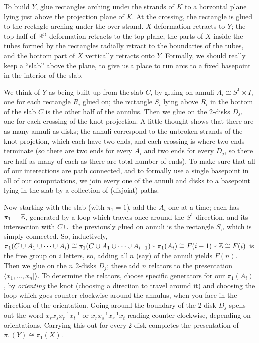 \msk


To build $Y$, glue rectangles arching under the strands of $K$ to a horzontal plane lying just above the projection plane of $K$. 
At the crossing, the rectangle is glued to the rectngle arching under the over-strand. $X$ deformation retracts to $Y$; the top half 
of ${\Bbb R}^3$ deformation retracts to the top plane, the parts of $X$ inside the tubes formed by the rectangles
radially retract to the boundaries of the tubes, and the bottom part of $X$ vertically retracts onto $Y$.
Formally, we should really keep a ``slab'' above the plane, to give us a place to run arcs to a fixed
basepoint in the interior of the slab.

\msk

We think of $Y$ as being built up from the slab $C$, by gluing on annuli $A_i\cong S^1\times I$, one for each rectangle $R_i$ glued on;
the rectangle $S_i$ lying above $R_i$ in the bottom of the slab $C$ is the other half of the annulus. Then we glue on the 2-disks $D_j$,
one for each crossing of the knot projection. A little thought shows that there are as many annuli as disks;
the annuli correspond to the unbroken strands of the knot projetion, which each have two ends, and each crossing is where
two ends terminate (so there are two ends for every $A_i$ and two ends for every $D_j$, so there are half as
many of each as there are total number of ends). To make sure that all of our interections are path connected,
and to formally use a single basepoint in all of our computations, we join every one of the annuli and disks to a basepoint lying
in the slab by a collection of (disjoint) paths.

\ssk

Now starting with the slab (with $\pi_1=1$), add the $A_i$ one at a time; each has $\pi_1={\Bbb Z}$,
generated by a loop which travels once around the $S^1$-direction, and its intersection with $C\cup$ the
previously glued on annuli is the rectangle $S_i$, which is simply connected. So, inductively,
$\pi_1(C\cup A_1\cup\cdots \cup A_i)\cong \pi_1(C\cup A_1\cup\cdots \cup A_{i-1})*\pi_1(A_i)\cong F(i-1)*{\Bbb Z}\cong F(i)$ is the 
free group on $i$ letters, so, adding all $n$ (say) of the annuli yields $F(n)$. Then we glue on the $n$ 2-disks $D_j$;
these add $n$ relators to the presentation $\langle x_1,\ldots,x_n | \rangle$. To determine the relators, choose specific 
generators for our $\pi_1(A_i)$,  by {\it orienting} the knot
(choosing a direction to travel around it) and choosing the loop which goes counter-clockwise around the annulus,
when you face in the direction of the orientation. Going around the boundary of the 2-disk
$D_j$ spells out the word $x_rx_sx_r^{-1}x_t^{-1}$ or  $x_rx_s^{-1}x_r^{-1}x_t$ reading counter-clockwise,
depending on orientations.
Carrying this out for every 2-disk completes the presentation of $\pi_1(Y)\cong \pi_1(X)$.


